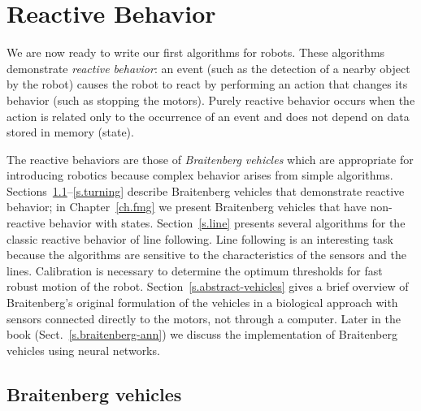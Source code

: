 
\chapter{Reactive Behavior}\label{ch.reactive}


We are now ready to write our first algorithms for robots. These algorithms demonstrate \emph{reactive behavior}: an event (such as the detection of a nearby object by the robot) causes the robot to react by performing an action that changes its behavior (such as stopping the motors). Purely reactive behavior occurs when the action is related only to the occurrence of an event and does not depend on data stored in memory (state).

The reactive behaviors are those of \emph{Braitenberg vehicles} which are appropriate for introducing robotics because complex behavior arises from simple algorithms. Sections~\ref{s.braitenberg}--\ref{s.turning} describe Braitenberg vehicles that demonstrate reactive behavior; in Chapter~\ref{ch.fmg} we present Braitenberg vehicles that have non-reactive behavior with states. Section~\ref{s.line} presents several algorithms for the classic reactive behavior of line following. Line following is an interesting task because the algorithms are sensitive to the characteristics of the sensors and the lines. Calibration is necessary to determine the optimum thresholds for fast robust motion of the robot. Section~\ref{s.abstract-vehicles} gives a brief overview of Braitenberg's original formulation of the vehicles in a biological approach with sensors connected directly to the motors, not through a computer. Later in the book (Sect.~\ref{s.braitenberg-ann}) we discuss the implementation of Braitenberg vehicles using neural networks.


\section{Braitenberg vehicles}\label{s.braitenberg}

